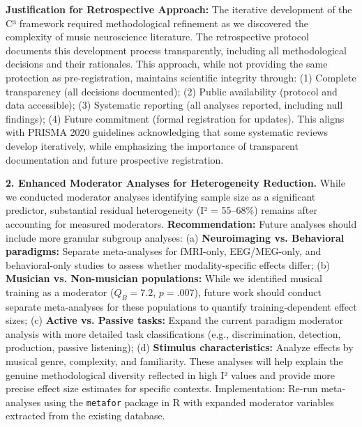 \documentclass[9pt,onecolumn]{article}
\begin{document}
\textbf{Justification for Retrospective Approach:} The iterative development of the C³ framework required methodological refinement as we discovered the complexity of music neuroscience literature. The retrospective protocol documents this development process transparently, including all methodological decisions and their rationales. This approach, while not providing the same protection as pre-registration, maintains scientific integrity through: (1) Complete transparency (all decisions documented); (2) Public availability (protocol and data accessible); (3) Systematic reporting (all analyses reported, including null findings); (4) Future commitment (formal registration for updates). This aligns with PRISMA 2020 guidelines acknowledging that some systematic reviews develop iteratively, while emphasizing the importance of transparent documentation and future prospective registration.

\textbf{2. Enhanced Moderator Analyses for Heterogeneity Reduction.} While we conducted moderator analyses identifying sample size as a significant predictor, substantial residual heterogeneity (I² = 55--68\%) remains after accounting for measured moderators. \textbf{Recommendation:} Future analyses should include more granular subgroup analyses: (a) \textbf{Neuroimaging vs. Behavioral paradigms:} Separate meta-analyses for fMRI-only, EEG/MEG-only, and behavioral-only studies to assess whether modality-specific effects differ; (b) \textbf{Musician vs. Non-musician populations:} While we identified musical training as a moderator ($Q_B = 7.2$, $p = .007$), future work should conduct separate meta-analyses for these populations to quantify training-dependent effect sizes; (c) \textbf{Active vs. Passive tasks:} Expand the current paradigm moderator analysis with more detailed task classifications (e.g., discrimination, detection, production, passive listening); (d) \textbf{Stimulus characteristics:} Analyze effects by musical genre, complexity, and familiarity. These analyses will help explain the genuine methodological diversity reflected in high I² values and provide more precise effect size estimates for specific contexts. Implementation: Re-run meta-analyses using the \texttt{metafor} package in R with expanded moderator variables extracted from the existing database.
\end{document}
